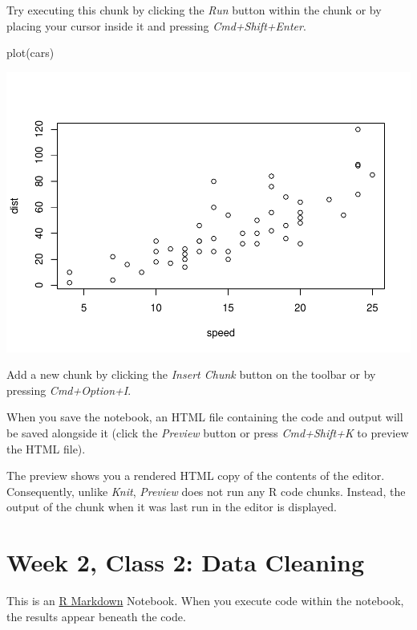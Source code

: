 \documentclass[
]{book}
\newenvironment{Shaded}{\begin{snugshade}}{\end{snugshade}}
\newcommand{\FunctionTok}[1]{\textcolor[rgb]{0.00,0.00,0.00}{#1}}
\newcommand{\NormalTok}[1]{#1}
\begin{document}
Try executing this chunk by clicking the \emph{Run} button within the chunk or by placing your cursor inside it and pressing \emph{Cmd+Shift+Enter}.

\begin{Shaded}
\begin{Highlighting}[]
\FunctionTok{plot}\NormalTok{(cars)}
\end{Highlighting}
\end{Shaded}

\includegraphics{_main_files/figure-latex/unnamed-chunk-28-1.pdf}

Add a new chunk by clicking the \emph{Insert Chunk} button on the toolbar or by pressing \emph{Cmd+Option+I}.

When you save the notebook, an HTML file containing the code and output will be saved alongside it (click the \emph{Preview} button or press \emph{Cmd+Shift+K} to preview the HTML file).

The preview shows you a rendered HTML copy of the contents of the editor. Consequently, unlike \emph{Knit}, \emph{Preview} does not run any R code chunks. Instead, the output of the chunk when it was last run in the editor is displayed.

\hypertarget{week-2-class-2-data-cleaning}{%
\chapter{Week 2, Class 2: Data Cleaning}\label{week-2-class-2-data-cleaning}}

This is an \href{http://rmarkdown.rstudio.com}{R Markdown} Notebook. When you execute code within the notebook, the results appear beneath the code.
\end{document}
